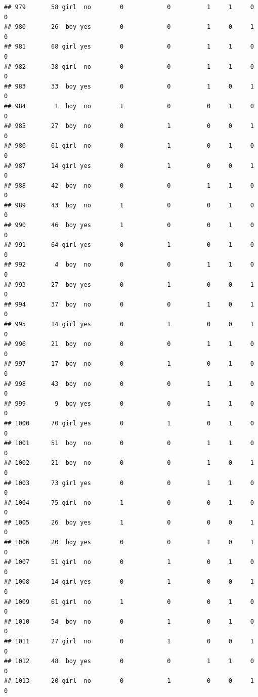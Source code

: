 \documentclass[man]{apa6}
\begin{document}
\begin{verbatim}
## 979       58 girl  no        0            0          1     1     0     0
## 980       26  boy yes        0            0          1     0     1     0
## 981       68 girl yes        0            0          1     1     0     0
## 982       38 girl  no        0            0          1     1     0     0
## 983       33  boy yes        0            0          1     0     1     0
## 984        1  boy  no        1            0          0     1     0     0
## 985       27  boy  no        0            1          0     0     1     0
## 986       61 girl  no        0            1          0     1     0     0
## 987       14 girl yes        0            1          0     0     1     0
## 988       42  boy  no        0            0          1     1     0     0
## 989       43  boy  no        1            0          0     1     0     0
## 990       46  boy yes        1            0          0     1     0     0
## 991       64 girl yes        0            1          0     1     0     0
## 992        4  boy  no        0            0          1     1     0     0
## 993       27  boy yes        0            1          0     0     1     0
## 994       37  boy  no        0            0          1     0     1     0
## 995       14 girl yes        0            1          0     0     1     0
## 996       21  boy  no        0            0          1     1     0     0
## 997       17  boy  no        0            1          0     1     0     0
## 998       43  boy  no        0            0          1     1     0     0
## 999        9  boy yes        0            0          1     1     0     0
## 1000      70 girl yes        0            1          0     1     0     0
## 1001      51  boy  no        0            0          1     1     0     0
## 1002      21  boy  no        0            0          1     0     1     0
## 1003      73 girl yes        0            0          1     1     0     0
## 1004      75 girl  no        1            0          0     1     0     0
## 1005      26  boy yes        1            0          0     0     1     0
## 1006      20  boy yes        0            0          1     0     1     0
## 1007      51 girl  no        0            1          0     1     0     0
## 1008      14 girl yes        0            1          0     0     1     0
## 1009      61 girl  no        1            0          0     1     0     0
## 1010      54  boy  no        0            1          0     1     0     0
## 1011      27 girl  no        0            1          0     0     1     0
## 1012      48  boy yes        0            0          1     1     0     0
## 1013      20 girl  no        0            1          0     0     1     0

\end{verbatim}
\end{document}
